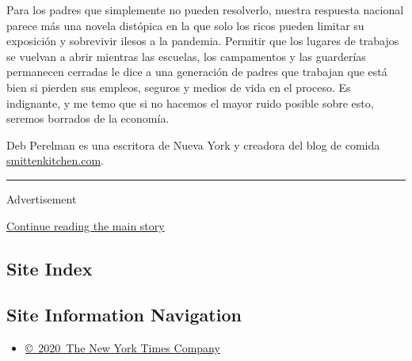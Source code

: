 Para los padres que simplemente no pueden resolverlo, nuestra respuesta
nacional parece más una novela distópica en la que solo los ricos pueden
limitar su exposición y sobrevivir ilesos a la pandemia. Permitir que
los lugares de trabajos se vuelvan a abrir mientras las escuelas, los
campamentos y las guarderías permanecen cerradas le dice a una
generación de padres que trabajan que está bien si pierden sus empleos,
seguros y medios de vida en el proceso. Es indignante, y me temo que si
no hacemos el mayor ruido posible sobre esto, seremos borrados de la
economía.

Deb Perelman es una escritora de Nueva York y creadora del blog de
comida \href{http://smittenkitchen.com/}{smittenkitchen.com}.

\begin{center}\rule{0.5\linewidth}{\linethickness}\end{center}

Advertisement

\protect\hyperlink{after-bottom}{Continue reading the main story}

\hypertarget{site-index}{%
\subsection{Site Index}\label{site-index}}

\hypertarget{site-information-navigation}{%
\subsection{Site Information
Navigation}\label{site-information-navigation}}

\begin{itemize}
\tightlist
\item
  \href{https://help.nytimes3xbfgragh.onion/hc/en-us/articles/115014792127-Copyright-notice}{©~2020~The
  New York Times Company}
\end{itemize}

